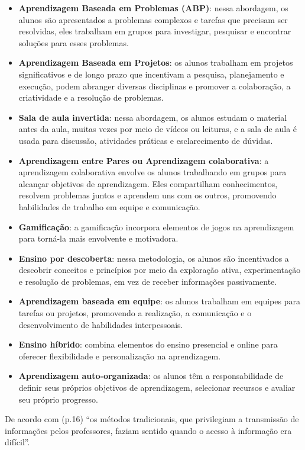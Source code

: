 \begin{itemize}
    \item \textbf{Aprendizagem Baseada em Problemas (ABP)}: nessa abordagem, os alunos são apresentados a problemas complexos e tarefas que precisam ser resolvidas, eles trabalham em grupos para investigar, pesquisar e encontrar soluções para esses problemas.
    \item \textbf{Aprendizagem Baseada em Projetos}: os alunos trabalham em projetos significativos e de longo prazo que incentivam a pesquisa, planejamento e execução, podem abranger diversas disciplinas e promover a colaboração, a criatividade e a resolução de problemas.
    \item \textbf{Sala de aula invertida}: nessa abordagem, os alunos estudam o material antes da aula, muitas vezes por meio de vídeos ou leituras, e a sala de aula é usada para discussão, atividades práticas e esclarecimento de dúvidas.
    \item \textbf{Aprendizagem entre Pares ou Aprendizagem colaborativa}: a aprendizagem colaborativa envolve os alunos trabalhando em grupos para alcançar objetivos de aprendizagem. Eles compartilham conhecimentos, resolvem problemas juntos e aprendem uns com os outros, promovendo habilidades de trabalho em equipe e comunicação.
    \item \textbf{Gamificação}: a gamificação incorpora elementos de jogos na aprendizagem para torná-la mais envolvente e motivadora.
    \item \textbf{Ensino por descoberta}: nessa metodologia, os alunos são incentivados a descobrir conceitos e princípios por meio da exploração ativa, experimentação e resolução de problemas, em vez de receber informações passivamente.
    \item \textbf{Aprendizagem baseada em equipe}: os alunos trabalham em equipes para tarefas ou projetos, promovendo a realização, a comunicação e o desenvolvimento de habilidades interpessoais.
    \item \textbf{Ensino híbrido}: combina elementos do ensino presencial e online para oferecer flexibilidade e personalização na aprendizagem.
    \item \textbf{Aprendizagem auto-organizada}: os alunos têm a responsabilidade de definir seus próprios objetivos de aprendizagem, selecionar recursos e avaliar seu próprio progresso.
\end{itemize}

De acordo com  (p.16) ``os métodos tradicionais, que privilegiam a transmissão de informações pelos professores, faziam sentido quando o acesso à informação era difícil''.

